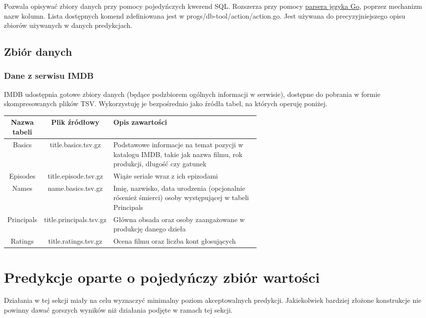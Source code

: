 \documentclass{article}
\begin{document}
Pozwala opisywać zbiory danych przy pomocy pojedyńczych kwerend SQL. Rozszerza przy pomocy \href{https://pkg.go.dev/go}{parsera języka Go}, poprzez mechanizm nazw kolumn. Lista dostępnych komend zdefiniowana jest w progs/db-tool/action/action.go. Jest używana do precyzyjniejszego opisu zbiorów używanych w danych predykcjach.

\subsection{Zbiór danych}

\subsubsection{Dane z serwisu IMDB}

IMDB udostępnia gotowe zbiory danych (będące podzbiorem ogólnych informacji w serwisie), dostępne do pobrania w formie skompresowanych plików TSV. Wykorzystuję je bezpośrednio jako źródła tabel, na których operuję poniżej.

\begin{center}
\begin{tabular}{ |c|c| p{0.6\linewidth} | }
	\hline
	\textbf{Nazwa tabeli} & \textbf{Plik źródłowy} & \textbf{Opis zawartości} \\ \hline
	Basics & title.basics.tsv.gz & Podstawowe informacje na temat pozycji w katalogu IMDB, takie jak nazwa filmu, rok produkcji, długość czy gatunek \\ \hline
	Episodes & title.episode.tsv.gz & Wiąże seriale wraz z ich epizodami \\ \hline
	Names & name.basics.tsv.gz & Imię, nazwisko, data urodzenia (opcjonalnie róœnież śmierci) osoby występującej w tabeli Principals \\ \hline
	Principals & title.principals.tsv.gz & Główna obsada oraz osoby zaangażowane w produkcję danego dzieła \\ \hline
	Ratings & title.ratings.tsv.gz & Ocena filmu oraz liczba kont głosujących \\ \hline
\end{tabular}
\end{center}

\pagebreak

\section{Predykcje oparte o pojedyńczy zbiór wartości}

Działania w tej sekcji miały na celu wyznaczyć minimalny poziom akceptowalnych predykcji. Jakiekolwiek bardziej złożone konstrukcje nie powinny dawać gorszych wyników niż działania podjęte w ramach tej sekcji.
\end{document}
